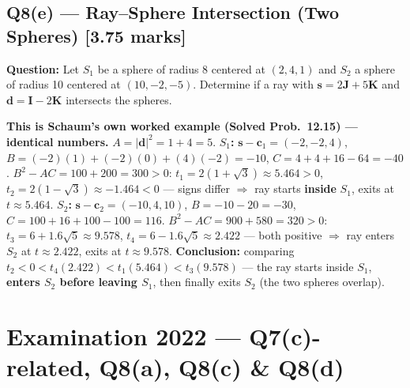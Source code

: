 \documentclass[12pt, a4paper]{article}
\newenvironment{solutionbox}{\begin{mdframed}[style=solutionframe]}{\end{mdframed}}
\newenvironment{answerbox}{\begin{mdframed}[style=answerframe]}{\end{mdframed}}
\begin{document}
\subsection*{Q8(e) --- Ray--Sphere Intersection (Two Spheres) [3.75 marks]}
\begin{solutionbox}
\textbf{Question:} Let $S_1$ be a sphere of radius 8 centered at $(2,4,1)$ and $S_2$ a sphere of radius 10 centered at $(10,-2,-5)$. Determine if a ray with $\mathbf{s}=2\mathbf{J}+5\mathbf{K}$ and $\mathbf{d}=\mathbf{I}-2\mathbf{K}$ intersects the spheres.
\end{solutionbox}
\begin{answerbox}
\textbf{This is Schaum's own worked example (Solved Prob.\ 12.15) --- identical numbers.} $A=|\mathbf{d}|^2=1+4=5$.
\textbf{$S_1$:} $\mathbf{s}-\mathbf{c}_1=(-2,-2,4)$, $B=(-2)(1)+(-2)(0)+(4)(-2)=-10$, $C=4+4+16-64=-40$. $B^2-AC=100+200=300>0$: $t_1=2(1+\sqrt3)\approx5.464>0$, $t_2=2(1-\sqrt3)\approx-1.464<0$ --- signs differ $\Rightarrow$ ray starts \textbf{inside} $S_1$, exits at $t\approx5.464$.
\textbf{$S_2$:} $\mathbf{s}-\mathbf{c}_2=(-10,4,10)$, $B=-10-20=-30$, $C=100+16+100-100=116$. $B^2-AC=900+580=320>0$: $t_3=6+1.6\sqrt5\approx9.578$, $t_4=6-1.6\sqrt5\approx2.422$ --- both positive $\Rightarrow$ ray enters $S_2$ at $t\approx2.422$, exits at $t\approx9.578$.
\textbf{Conclusion:} comparing $t_2{<}0{<}t_4(2.422){<}t_1(5.464){<}t_3(9.578)$ --- the ray starts inside $S_1$, \textbf{enters $S_2$ before leaving $S_1$}, then finally exits $S_2$ (the two spheres overlap).
\end{answerbox}

\section{Examination 2022 --- Q7(c)-related, Q8(a), Q8(c) \& Q8(d)}
\end{document}
